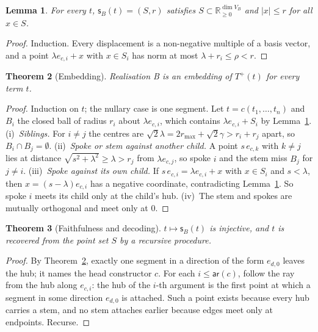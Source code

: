 \documentclass[11pt]{article}
\newtheorem{theorem}{Theorem}
\newtheorem{lemma}[theorem]{Lemma}
\theoremstyle{definition}
\theoremstyle{remark}
\newcommand{\R}{\mathbb{R}}
\newcommand{\ar}{\mathsf{ar}}
\newcommand{\sh}{\mathsf{s}}
\newcommand{\rad}{r}
\begin{document}
\begin{lemma}\label{lem:orthant}
For every $t$, $\sh_B(t)=(S,\rad)$ satisfies $S\subset\R_{\ge0}^{\dim V_B}$ and
$|x|\le\rad$ for all $x\in S$.
\end{lemma}
\begin{proof}
Induction. Every displacement is a non-negative multiple of a basis vector, and a
point $\lambda e_{c,i}+x$ with $x\in S_i$ has norm at most
$\lambda+\rad_i\le\rho<\rad$.
\end{proof}

\begin{theorem}[Embedding]\label{thm:emb}
Realisation B is an embedding of $T^+(t)$ for every term $t$.
\end{theorem}
\begin{proof}
Induction on $t$; the nullary case is one segment. Let $t=c(t_1,\dots,t_n)$ and
$B_i$ the closed ball of radius $\rad_i$ about $\lambda e_{c,i}$, which contains
$\lambda e_{c,i}+S_i$ by Lemma~\ref{lem:orthant}.
(i)~\emph{Siblings.} For $i\ne j$ the centres are $\sqrt2\lambda
=2\rad_{\max}+\sqrt2\gamma>\rad_i+\rad_j$ apart, so $B_i\cap B_j=\emptyset$.
(ii)~\emph{Spoke or stem against another child.} A point $s\,e_{c,k}$ with
$k\ne j$ lies at distance $\sqrt{s^2+\lambda^2}\ge\lambda>\rad_j$ from
$\lambda e_{c,j}$, so spoke $i$ and the stem miss $B_j$ for $j\ne i$.
(iii)~\emph{Spoke against its own child.} If $s\,e_{c,i}=\lambda e_{c,i}+x$ with
$x\in S_i$ and $s<\lambda$, then $x=(s-\lambda)e_{c,i}$ has a negative
coordinate, contradicting Lemma~\ref{lem:orthant}. So spoke $i$ meets its child
only at the child's hub.
(iv)~The stem and spokes are mutually orthogonal and meet only at $0$.
\end{proof}

\begin{theorem}[Faithfulness and decoding]\label{thm:faith}
$t\mapsto\sh_B(t)$ is injective, and $t$ is recovered from the point set $S$ by a
recursive procedure.
\end{theorem}
\begin{proof}
By Theorem~\ref{thm:emb}, exactly one segment in a direction of the form
$e_{d,0}$ leaves the hub; it names the head constructor $c$. For each
$i\le\ar(c)$, follow the ray from the hub along $e_{c,i}$: the hub of the $i$-th
argument is the first point at which a segment in some direction $e_{d,0}$ is
attached. Such a point exists because every hub carries a stem, and no stem
attaches earlier because edges meet only at endpoints. Recurse.
\end{proof}
\end{document}
